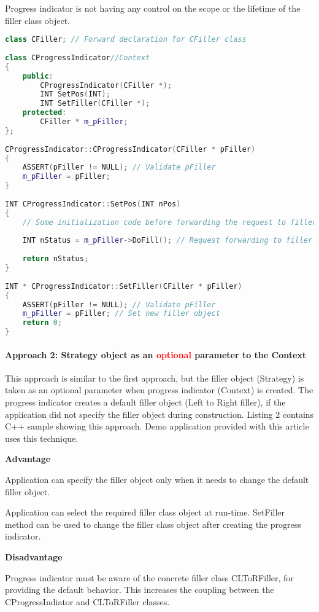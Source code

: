 \documentclass{book}
\begin{document}
    Progress indicator is not having any control on the scope or the lifetime of the filler class object. 
\begin{lstlisting}[caption={Strategy Pattern Sample 4: Approach 1 - Strategy object as a \textcolor{red}{required} parameter to the Context}, language=C++]
class CFiller; // Forward declaration for CFiller class
 
class CProgressIndicator//Context
{
	public:
		CProgressIndicator(CFiller *);
		INT SetPos(INT);
		INT SetFiller(CFiller *);
	protected:
		CFiller * m_pFiller;
};
 
CProgressIndicator::CProgressIndicator(CFiller * pFiller)
{
	ASSERT(pFiller != NULL); // Validate pFiller 
	m_pFiller = pFiller;
}
 
INT CProgressIndicator::SetPos(INT nPos)
{
	// Some initialization code before forwarding the request to filler object
		
	INT nStatus = m_pFiller->DoFill(); // Request forwarding to filler object
		
	return nStatus;
}
 
INT * CProgressIndicator::SetFiller(CFiller * pFiller)
{
	ASSERT(pFiller != NULL); // Validate pFiller
	m_pFiller = pFiller; // Set new filler object
	return 0;
}
\end{lstlisting}
\paragraph{Approach 2: Strategy object as an \textcolor{red}{optional} parameter to the Context}

This approach is similar to the first approach, but the filler object (Strategy) is taken as an optional parameter when progress indicator (Context) is created.
The progress indicator creates a default filler object (Left to Right filler), if the application did not specify the filler object during construction.
Listing 2 contains C++ sample showing this approach. Demo application provided with this article uses this technique.

\textbf{Advantage}

    Application can specify the filler object only when it needs to change the default filler object.

    Application can select the required filler class object at run-time. SetFiller method can be used to change the filler class object after creating the progress indicator.

\textbf{Disadvantage}

    Progress indicator must be aware of the concrete filler class CLToRFiller, for providing the default behavior. This increases the coupling between the CProgressIndiator and CLToRFiller classes.
\end{document}

